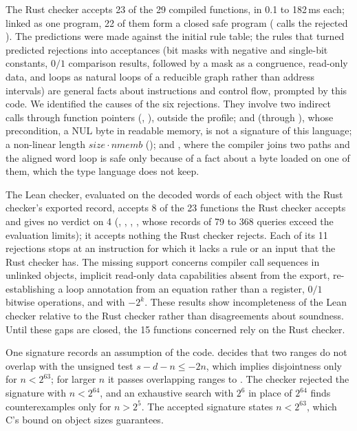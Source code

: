 The Rust checker accepts 23 of the 29 compiled functions, in 0.1 to 182\,ms each; linked as one program, 22 of them form a closed safe program ( calls the rejected ). The predictions were made against the initial rule table; the rules that turned predicted rejections into acceptances (bit masks with negative and single-bit constants, $0/1$ comparison results,  followed by a mask as a congruence, read-only data, and loops as natural loops of a reducible graph rather than address intervals) are general facts about instructions and control flow, prompted by this code. We identified the causes of the six rejections. They involve two indirect calls through function pointers (, ), outside the profile;  and  (through ), whose precondition, a NUL byte in readable memory, is not a signature of this language; a non-linear length $\mathit{size}\cdot\mathit{nmemb}$ (); and , where the compiler joins two paths and the aligned word loop is safe only because of a fact about a byte loaded on one of them, which the type language does not keep.

The Lean checker, evaluated on the decoded words of each object with the Rust checker's exported record, accepts 8 of the 23 functions the Rust checker accepts and gives no verdict on 4 (, , , , whose records of 79 to 368 queries exceed the evaluation limits); it accepts nothing the Rust checker rejects. Each of its 11 rejections stops at an instruction for which it lacks a rule or an input that the Rust checker has. The missing support concerns compiler call sequences in unlinked objects, implicit read-only data capabilities absent from the export, re-establishing a loop annotation from an equation rather than a register, $0/1$ bitwise operations, and  with $-2^k$. These results show incompleteness of the Lean checker relative to the Rust checker rather than disagreements about soundness. Until these gaps are closed, the 15 functions concerned rely on the Rust checker.

One signature records an assumption of the code.  decides that two ranges do not overlap with the unsigned test $s-d-n\le-2n$, which implies disjointness only for $n<2^{63}$; for larger $n$ it passes overlapping ranges to . The checker rejected the signature with $n<2^{64}$, and an exhaustive search with $2^6$ in place of $2^{64}$ finds counterexamples only for $n>2^5$. The accepted signature states $n<2^{63}$, which C's bound on object sizes guarantees.

